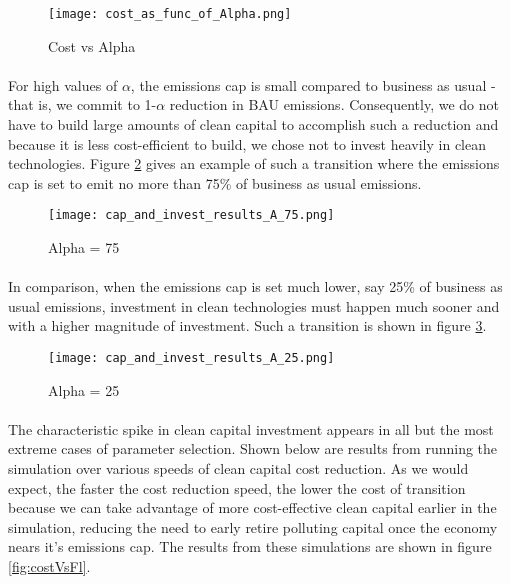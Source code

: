 \documentclass[singlespace]{easychithesis}
\begin{document}
\begin{figure}[h]
\texttt{[image: cost\_as\_func\_of\_Alpha.png]}
\caption{Cost vs Alpha\label{fig:costVsAlpha}}
\end{figure}



\paragraph{} For high values of $\alpha$, the emissions cap is small compared to business as usual - that is, we commit to 1-$\alpha$ reduction in BAU emissions. Consequently, we do not have to build large amounts of clean capital to accomplish such a reduction and because it is less cost-efficient to build, we chose not to invest heavily in clean technologies. Figure \ref{fig:SimpleResultsA=75} gives an example of such a transition where the emissions cap is set to emit no more than 75\% of business as usual emissions. 

\begin{figure}[h]
\texttt{[image: cap\_and\_invest\_results\_A\_75.png]}
\caption{Alpha = 75\label{fig:SimpleResultsA=75}}
\end{figure}





\paragraph{} In comparison, when the emissions cap is set much lower, say 25\% of business as usual emissions, investment in clean technologies must happen much sooner and with a higher magnitude of investment. Such a transition is shown in figure \ref{fig:SimpleResultsA=25}. 

\begin{figure}[h]
\texttt{[image: cap\_and\_invest\_results\_A\_25.png]}
\caption{Alpha = 25\label{fig:SimpleResultsA=25}}
\end{figure}



\paragraph{} The characteristic spike in clean capital investment appears in all but the most extreme cases of parameter selection. Shown below are results from running the simulation over various speeds of clean capital cost reduction. As we would expect, the faster the cost reduction speed, the lower the cost of transition because we can take advantage of more cost-effective clean capital earlier in the simulation, reducing the need to early retire polluting capital once the economy nears it's emissions cap. The results from these simulations are shown in figure \ref{fig:costVsFl}. 
\end{document}
